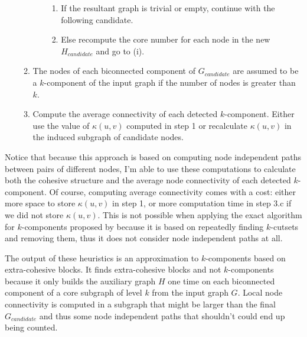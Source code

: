 \begin{enumerate}
\begin{enumerate}
\begin{enumerate}
\begin{enumerate}

\item If the resultant graph is trivial or empty, continue with the following candidate.

\item Else recompute the core number for each node in the new $H_{candidate}$ and go to (i).

\end{enumerate}


\end{enumerate}

\item The nodes of each biconnected component of $G_{candidate}$ are assumed to be a $k$-component of the input graph if the number of nodes is greater than $k$.

\item Compute the average connectivity of each detected $k$-component. Either use the value of $\kappa(u,v)$ computed in step 1 or recalculate $\kappa(u,v)$ in the induced subgraph of candidate nodes.

\end{enumerate}

\end{enumerate}

Notice that because this approach is based on computing node independent paths between pairs of different nodes, I'm able to use these computations to calculate both the cohesive structure and the average node connectivity of each detected $k$-component. Of course, computing average connectivity comes with a cost: either more space to store $\kappa(u,v)$ in step 1, or more computation time in step 3.c if we did not store $\kappa(u,v)$. This is not possible when applying the exact algorithm for $k$-components proposed by \citet{moody:2003} because it is based on repeatedly finding $k$-cutsets and removing them, thus it does not consider node independent paths at all.

The output of these heuristics is an approximation to $k$-components based on extra-cohesive blocks. It finds extra-cohesive blocks and not $k$-components because it only builds the auxiliary graph $H$ one time on each biconnected component of a core subgraph of level $k$ from the input graph $G$. Local node connectivity is computed in a subgraph that might be larger than the final $G_{candidate}$ and thus some node independent paths that shouldn't could end up being counted. 

